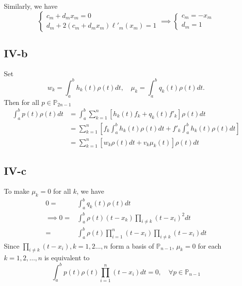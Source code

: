 \documentclass[a4paper]{article}
\begin{document}
Similarly, we have
\[
\begin{cases}
    c_m + d_m x_m = 0\\
    d_m + 2(c_m + d_m x_m)\ell'_m(x_m) = 1
\end{cases}
\implies
\begin{cases}
    c_m = -x_m\\
    d_m = 1
\end{cases}
\]

\subsection*{IV-b}
Set \[
w_k = \int_{a}^{b} h_k(t) \rho(t) dt,\quad \mu_k = \int_{a}^{b} q_k(t) \rho(t)dt.
\]
Then for all \(p \in \mathbb{P}_{2n-1}\)
\begin{align*}
    \int_{a}^{b} p(t)
    \rho(t) dt& = \int_{a}^{b} \sum_{k=1}^{n} [h_k(t)f_k + q_k(t)f'_k] \rho(t) dt\\
    & = \sum_{k = 1}^{n} [f_k\int_{a}^{b} h_k(t) \rho(t)dt +f'_k\int_{a}^{b} h_k(t) \rho(t)dt ]\\
    & = \sum_{k = 1}^{n} [w_k \rho(t)dt +v_k \mu_k(t)] \rho(t)dt 
\end{align*}

\subsection*{IV-c}
To make \(\mu_k = 0\) for all \(k\), we have
\begin{align*}
    0 =& \int_{a}^{b} q_k(t) \rho(t)dt\\ 
 \implies   0=&\int_{a}^{b}\rho(t)(t-x_k)\prod_{i\neq k}(t-x_i)^2 dt\\
    =&\int_{a}^{b}\rho(t)\prod_{i = 1}^{n} (t-x_i) \prod_{i\neq k}(t-x_i) dt
\end{align*}
Since \(\prod_{i\neq k}(t-x_i), k = 1,2\ldots,n\) form a basis of \(\mathbb{P}_{n-1}\), \(\mu_k = 0\) for each 
\(k = 1,2,\ldots, n\) is equivalent to
\[
\int_{a}^{b}p(t)\rho(t)\prod_{i = 1}^{n}(t-x_i)dt = 0,\quad \forall p \in \mathbb{P}_{n-1}
\]  




\end{document}

